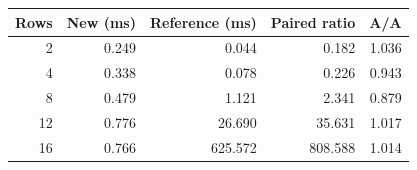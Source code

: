 \begin{tabular}{rrrrr}
\toprule
Rows & New (ms) & Reference (ms) & Paired ratio & A/A \\
\midrule
2 & 0.249 & 0.044 & 0.182 & 1.036 \\
4 & 0.338 & 0.078 & 0.226 & 0.943 \\
8 & 0.479 & 1.121 & 2.341 & 0.879 \\
12 & 0.776 & 26.690 & 35.631 & 1.017 \\
16 & 0.766 & 625.572 & 808.588 & 1.014 \\
\bottomrule
\end{tabular}
